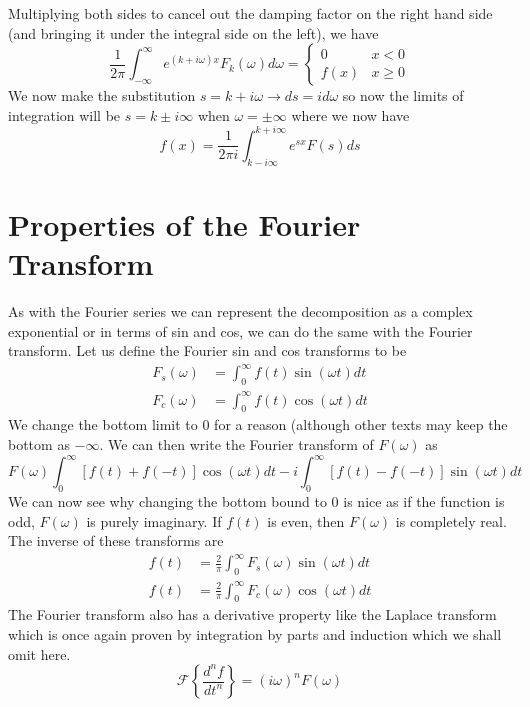\documentclass{report}
\theoremstyle{definition}
\theoremstyle{remark}
\newcommand{\ft}[1]{\mathscr{F}\left\{ #1\right\}}
\newcommand{\od}[2]{\frac{d #1}{d#2}}
\begin{document}
Multiplying both sides to cancel out the damping factor on the right hand side (and bringing it under the integral side on the left), we have 
\begin{equation*}
    \frac{1}{2\pi}\int^\infty_{-\infty}e^{(k+i\omega )x}F_k(\omega)d \omega = \begin{cases}
        0 &x<0 \\f(x)&x\geq 0
    \end{cases}
\end{equation*}
We now make the substitution $s=k+i\omega\rightarrow ds = id\omega$ so now the limits of integration will be $s=k\pm i\infty$ when $\omega=\pm \infty$ where we now have 
\begin{equation*}
    f(x)=\frac{1}{2\pi i}\int^{k+i\infty}_{k-i\infty}e^{sx}F(s)ds
\end{equation*}



\section{Properties of the Fourier Transform}
As with the Fourier series we can represent the decomposition as a complex exponential or in terms of sin and cos, we can do the same with the Fourier transform. Let us define the Fourier sin and cos transforms to be 
\begin{equation*}
\begin{split}
    F_s(\omega)&=\int^\infty_0f(t)\sin(\omega t)dt \\
    F_c(\omega)&=\int^\infty_0f(t)\cos(\omega t)dt
\end{split}
\end{equation*}
We change the bottom limit to 0 for a reason (although other texts may keep the bottom as $-\infty$. We can then write the Fourier transform of $F(\omega)$ as 
\begin{equation*}
    F(\omega)\int^\infty_0[f(t)+f(-t)]\cos (\omega t)dt - i\int^\infty_0[f(t)-f(-t)]\sin (\omega t)dt
\end{equation*}
We can now see why changing the bottom bound to 0 is nice as if the function is odd, $F(\omega)$ is purely imaginary. If $f(t)$ is even, then $F(\omega)$ is completely real. The inverse of these transforms are 
\begin{equation*}
\begin{split}
    f(t)&=\frac{2}{\pi}\int^\infty_0F_s(\omega)\sin(\omega t)dt \\
    f(t)&=\frac{2}{\pi}\int^\infty_0F_c(\omega)\cos(\omega t)dt
\end{split}
\end{equation*}
The Fourier transform also has a derivative property like the Laplace transform which is once again proven by integration by parts and induction which we shall omit here. 
\begin{equation*}
    \ft{\od{^nf}{t^n}} = (i\omega)^nF(\omega)
\end{equation*}
\end{document}
